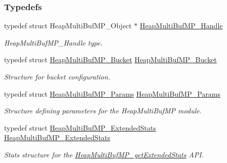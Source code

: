 \subsubsection*{Typedefs}
\begin{DoxyCompactItemize}
\item 
typedef struct HeapMultiBufMP\_\-Object $\ast$ \hyperlink{_heap_multi_buf_m_p_8h_a84a0dbef1eb25a19072649a3c30ed4e6}{HeapMultiBufMP\_\-Handle}
\begin{DoxyCompactList}\small\item\em HeapMultiBufMP\_\-Handle type. \item\end{DoxyCompactList}\item 
typedef struct \hyperlink{struct_heap_multi_buf_m_p___bucket}{HeapMultiBufMP\_\-Bucket} \hyperlink{_heap_multi_buf_m_p_8h_ae5ebd64bf1712fe348d9fa6ba7d93017}{HeapMultiBufMP\_\-Bucket}
\begin{DoxyCompactList}\small\item\em Structure for bucket configuration. \item\end{DoxyCompactList}\item 
typedef struct \hyperlink{struct_heap_multi_buf_m_p___params}{HeapMultiBufMP\_\-Params} \hyperlink{_heap_multi_buf_m_p_8h_a99f17c33d2dc597764d5e3cab6f96762}{HeapMultiBufMP\_\-Params}
\begin{DoxyCompactList}\small\item\em Structure defining parameters for the HeapMultiBufMP module. \item\end{DoxyCompactList}\item 
typedef struct \hyperlink{struct_heap_multi_buf_m_p___extended_stats}{HeapMultiBufMP\_\-ExtendedStats} \hyperlink{_heap_multi_buf_m_p_8h_a1182cc241dd94d235a2b6d1b74afc2e1}{HeapMultiBufMP\_\-ExtendedStats}
\begin{DoxyCompactList}\small\item\em Stats structure for the \hyperlink{_heap_multi_buf_m_p_8h_a386420101752537b59e12520aafd9b0d}{HeapMultiBufMP\_\-getExtendedStats} API. \item\end{DoxyCompactList}\end{DoxyCompactItemize}
